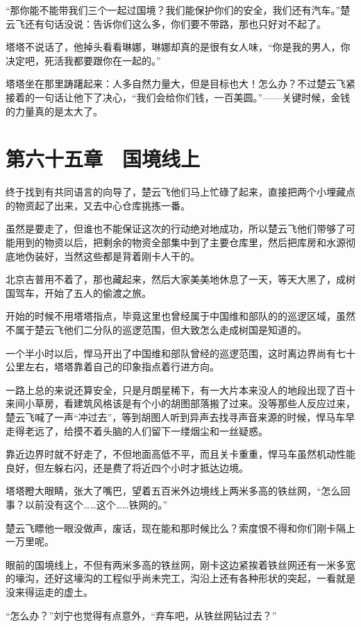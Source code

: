 “那你能不能带我们三个一起过国境？我们能保护你们的安全，我们还有汽车。”楚云飞还有句话没说：告诉你们这么多，你们要不带路，那也只好对不起了。

塔塔不说话了，他掉头看看琳娜，琳娜却真的是很有女人味，“你是我的男人，你决定吧，死活我都要跟你在一起的。”

塔塔坐在那里踌躇起来：人多自然力量大，但是目标也大！怎么办？不过楚云飞紧接着的一句话让他下了决心，“我们会给你们钱，一百美圆。”——关键时候，金钱的力量真的是太大了。

\section{第六十五章　国境线上}

终于找到有共同语言的向导了，楚云飞他们马上忙碌了起来，直接把两个小埋藏点的物资起了出来，又去中心仓库挑拣一番。

虽然是要走了，但谁也不能保证这次的行动绝对地成功，所以楚云飞他们带够了可能用到的物资以后，把剩余的物资全部集中到了主要仓库里，然后把库房和水源彻底地伪装好，当然这些都是背着刚卡人干的。

北京吉普用不着了，那也藏起来，然后大家美美地休息了一天，等天大黑了，成树国驾车，开始了五人的偷渡之旅。

开始的时候不用塔塔指点，毕竟这里也曾经属于中国维和部队的的巡逻区域，虽然不属于楚云飞他们二分队的巡逻范围，但大致怎么走成树国是知道的。

一个半小时以后，悍马开出了中国维和部队曾经的巡逻范围，这时离边界尚有七十公里左右，塔塔靠着自己的印象指点着行进方向。

一路上总的来说还算安全，只是月朗星稀下，有一大片本来没人的地段出现了百十来间小草房，看建筑风格该是有个小的胡图部落搬了过来。没等那些人反应过来，楚云飞喊了一声“冲过去”，等到胡图人听到异声去找寻声音来源的时候，悍马车早走得老远了，给摸不着头脑的人们留下一缕烟尘和一丝疑惑。

靠近边界时就不好走了，不但地面高低不平，而且关卡重重，悍马车虽然机动性能良好，但左躲右闪，还是费了将近四个小时才抵达边境。

塔塔瞪大眼睛，张大了嘴巴，望着五百米外边境线上两米多高的铁丝网，“怎么回事？以前没有这个……这个……铁网的。”

楚云飞瞟他一眼没做声，废话，现在能和那时候比么？索度恨不得和你们刚卡隔上一万里呢。

眼前的国境线上，不但有两米多高的铁丝网，刚卡这边紧挨着铁丝网还有一米多宽的壕沟，还好这壕沟的工程似乎尚未完工，沟沿上还有各种形状的突起，一看就是没来得运走的虚土。

“怎么办？”刘宁也觉得有点意外，“弃车吧，从铁丝网钻过去？”

